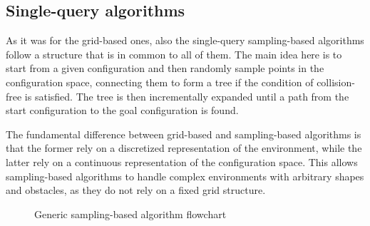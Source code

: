 \subsection{Single-query algorithms}
\label{sec:single_query_algorithms}

As it was for the grid-based ones, also the single-query sampling-based algorithms follow a structure that is in common to all of them.
The main idea here is to start from a given configuration and then randomly sample points in the configuration space, connecting them to form a tree if the condition of collision-free is satisfied.
The tree is then incrementally expanded until a path from the start configuration to the goal configuration is found.

The fundamental difference between grid-based and sampling-based algorithms is that the former rely on a discretized representation of the environment, while the latter rely on a continuous representation of the configuration space.
This allows sampling-based algorithms to handle complex environments with arbitrary shapes and obstacles, as they do not rely on a fixed grid structure.

\begin{figure}[H]
    \centering


    \caption{Generic sampling-based algorithm flowchart}
    \label{fig:sampling_based_flowchart}

\end{figure}

